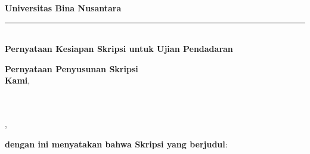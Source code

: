 \thispagestyle{plain}
    \begin{center}
    \textbf{Universitas Bina Nusantara}\\
    \vspace*{-0.5cm}
    \rule{13cm}{1pt} \\
    \vspace*{-0.2cm}
    \textbf{Pernyataan Kesiapan Skripsi untuk Ujian Pendadaran}
    \end{center}



    \textbf{Pernyataan Penyusunan Skripsi}\\
    \indent\textbf{Kami}, 

    \indent\textbf{\penulisSatu} \\
    \indent\textbf{\penulisDua} \\
    \indent\textbf{\penulisTiga},

    \textbf{dengan ini menyatakan bahwa Skripsi yang berjudul}: 

    \begin{center}
    \textbf{\Judul}\\
    \textit{\textbf{\JudulInggris}}\\
    \end{center}
    
